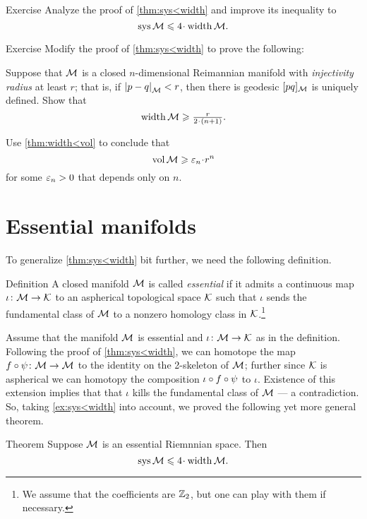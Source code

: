\begin{thm}{Exercise}\label{ex:sys<width}
Analyze the proof of \ref{thm:sys<width} and improve its inequality to 
 \[\sys\spc{M}\le 4 \cdot \width \spc{M}.\]
\end{thm}

\begin{thm}{Exercise}\label{ex:fillrad-inj}
Modify the proof of \ref{thm:sys<width} to prove the following:

Suppose that $\mathcal{M}$ is a closed $n$-dimensional Reimannian manifold with \emph{injectivity radius} at least $r$; that is, if $\dist{p}{q}{\spc{M}}<r$, then there is geodesic $[pq]_{\mathcal{M}}$ is uniquely defined.
Show that
\[\width\spc{M}\ge \tfrac{r}{2\cdot(n+1)}.\]

Use \ref{thm:width<vol} to conclude that  
\[\vol\spc{M}\ge \eps_n \cdot r^n \]
for some $\varepsilon_n>0$ that depends only on $n$.
\end{thm} 

\section{Essential manifolds}

To generalize \ref{thm:sys<width} bit further, we need the following definition.

\begin{thm}{Definition}
A closed manifold $\mathcal{M}$ is called \emph{essential} if it admits a continuous map $\iota\colon\mathcal{M}\to \mathcal{K}$ to an aspherical topological space $\mathcal{K}$ such that $\iota$ sends the fundamental class of $\mathcal{M}$ to a nonzero homology class in $\mathcal{K}$.\footnote{We assume that the coefficients are $\mathbb{Z}_2$, but one can play with them if necessary.}
\end{thm}

Assume that the manifold $\mathcal{M}$ is essential and $\iota \colon\mathcal{M}\to \mathcal{K}$ as in the definition.
Following the proof of \ref{thm:sys<width}, we can homotope the map 
$f\circ\psi\colon\mathcal{M}\to \mathcal{M}$ to the identity on the 2-skeleton of $\mathcal{M}$;
further since $\mathcal{K}$ is aspherical we can homotopy the composition
$\iota\z\circ f\circ\psi$ to  $\iota$. 
Existence of this extension implies that that $\iota$ kills the fundamental class of $\mathcal{M}$ --- a contradiction.
So, taking \ref{ex:sys<width} into account, we proved the following yet more general theorem.

\begin{thm}{Theorem}\label{thm:sys<width++}
Suppose $\mathcal{M}$ is an essential Riemnnian space.
Then 
\[\sys\spc{M}\le 4 \cdot \width \spc{M}.\]
\end{thm}

